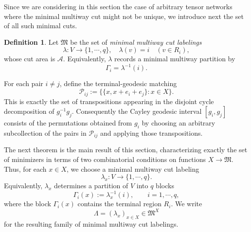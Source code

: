\documentclass[11pt,oneside,letterpaper]{article}
\numberwithin{equation}{section}
\theoremstyle{definition}
\newtheorem{definition}[theorem]{Definition}
\theoremstyle{remark}
\begin{document}
Since we are considering in this section the case of arbitrary tensor networks where the minimal multiway cut might not be unique, we introduce next the set of all such minimal cuts.

\begin{definition}
  \label{def:cut-geodesic-data}
  Let $\mathfrak{M}$ be the set of \emph{minimal multiway cut labelings}
  \begin{equation}
    \lambda:V\to\{1,\cdots,q\},\quad
    \lambda(v)=i\quad (v\in R_i),
  \end{equation}
  whose cut area is $\mathcal{A}$.  Equivalently, $\lambda$ records a
  minimal multiway partition by
  \begin{equation}
    \Gamma_i=\lambda^{-1}(i).
  \end{equation}

  For each pair $i\ne j$, define the terminal-geodesic matching
  \begin{equation}\label{eq:terminal-geodesic-matching}
    \mathcal{P}_{ij}:=\{\{x,x+e_i+e_j\}:x\in X\}.
  \end{equation}
  This is exactly the set of transpositions appearing in the disjoint
  cycle decomposition of $g_i^{-1}g_j$.  Consequently the Cayley
  geodesic interval $[g_i,g_j]$ consists of the permutations obtained
  from $g_i$ by choosing an arbitrary subcollection of the pairs in
  $\mathcal{P}_{ij}$ and applying those transpositions.
\end{definition}

The next theorem is the main result of this section, characterizing
exactly the set of minimizers in terms of two combinatorial conditions on
functions $X \to \mathfrak M$.  Thus, for each $x\in X$, we choose a
minimal multiway cut labeling
\begin{equation}
  \lambda_x:V\to\{1,\cdots,q\}.
\end{equation}
Equivalently, $\lambda_x$ determines a partition of $V$ into $q$ blocks
\begin{equation}
  \Gamma_i(x):=\lambda_x^{-1}(i),\qquad i=1,\cdots,q,
\end{equation}
where the block $\Gamma_i(x)$ contains the terminal region $R_i$.  We
write
\begin{equation}
  \Lambda=(\lambda_x)_{x\in X}\in\mathfrak{M}^X
\end{equation}
for the resulting family of minimal multiway cut labelings.
\end{document}
